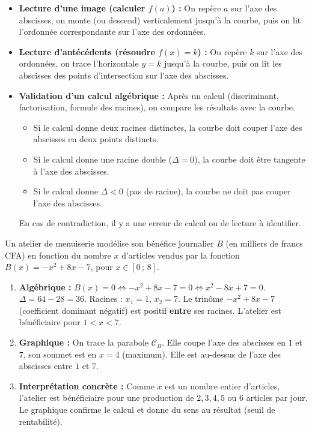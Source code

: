 \documentclass[11pt]{article}
\begin{document}
\begin{itemize}
\item \textbf{Lecture d'une image (calculer $f(a)$) :} On repère $a$ sur l'axe des abscisses, on monte (ou descend) verticalement jusqu'à la courbe, puis on lit l'ordonnée correspondante sur l'axe des ordonnées.
\item \textbf{Lecture d'antécédents (résoudre $f(x)=k$) :} On repère $k$ sur l'axe des ordonnées, on trace l'horizontale $y=k$ jusqu'à la courbe, puis on lit les abscisses des points d'intersection sur l'axe des abscisses.
\item \textbf{Validation d'un calcul algébrique :} Après un calcul (discriminant, factorisation, formule des racines), on compare les résultats avec la courbe.
\begin{itemize}
\item Si le calcul donne deux racines distinctes, la courbe doit couper l'axe des abscisses en deux points distincts.
\item Si le calcul donne une racine double ($\Delta=0$), la courbe doit être tangente à l'axe des abscisses.
\item Si le calcul donne $\Delta<0$ (pas de racine), la courbe ne doit pas couper l'axe des abscisses.
\end{itemize}
En cas de contradiction, il y a une erreur de calcul ou de lecture à identifier.
\end{itemize}

\begin{exemplebox}
Un atelier de menuiserie modélise son bénéfice journalier $B$ (en milliers de francs CFA) en fonction du nombre $x$ d'articles vendus par la fonction $B(x)=-x^2+8x-7$, pour $x\in[0\,;\,8]$.
\begin{enumerate}
\item \textbf{Algébrique :} $B(x)=0 \iff -x^2+8x-7=0 \iff x^2-8x+7=0$. $\Delta=64-28=36$. Racines : $x_1=1$, $x_2=7$.
Le trinôme $-x^2+8x-7$ (coefficient dominant négatif) est positif \textbf{entre} ses racines. L'atelier est bénéficiaire pour $1<x<7$.
\item \textbf{Graphique :} On trace la parabole $\mathcal{C}_B$. Elle coupe l'axe des abscisses en $1$ et $7$, son sommet est en $x=4$ (maximum). Elle est au-dessus de l'axe des abscisses entre $1$ et $7$.
\item \textbf{Interprétation concrète :} Comme $x$ est un nombre entier d'articles, l'atelier est bénéficiaire pour une production de $2, 3, 4, 5$ ou $6$ articles par jour. Le graphique confirme le calcul et donne du sens au résultat (seuil de rentabilité).
\end{enumerate}
\end{exemplebox}
\end{document}
